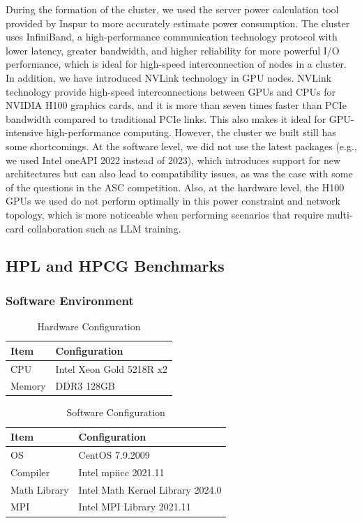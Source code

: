 \documentclass[a4paper,12pt]{article}
\begin{document}
During the formation of the cluster, we used the server power calculation tool provided by Inspur to more accurately estimate power consumption. The cluster uses InfiniBand, a high-performance communication technology protocol with lower latency, greater bandwidth, and higher reliability for more powerful I/O performance, which is ideal for high-speed interconnection of nodes in a cluster. In addition, we have introduced NVLink technology in GPU nodes. NVLink technology provide high-speed interconnections between GPUs and CPUs for NVIDIA H100 graphics cards, and it is more than seven times faster than PCIe bandwidth compared to traditional PCIe links. This also makes it ideal for GPU-intensive high-performance computing. However, the cluster we built still has some shortcomings. At the software level, we did not use the latest packages (e.g., we used Intel oneAPI 2022 instead of 2023), which introduces support for new architectures but can also lead to compatibility issues, as was the case with some of the questions in the ASC competition. Also, at the hardware level, the H100 GPUs we used do not perform optimally in this power constraint and network topology, which is more noticeable when performing scenarios that require multi-card collaboration such as LLM training.

\subsection{HPL and HPCG Benchmarks}

\subsubsection{Software Environment}
\begin{table}[H]
\centering
\caption{Hardware Configuration}
\begin{tabular}{|l|l|}
\hline
Item & Configuration \\
\hline
CPU & Intel Xeon Gold 5218R x2 \\
\hline
Memory & DDR3 128GB \\
\hline
\end{tabular}
\end{table}

\begin{table}[H]
\centering
\caption{Software Configuration}
\begin{tabular}{|l|l|}
\hline
Item & Configuration \\
\hline
OS & CentOS 7.9.2009 \\
\hline
Compiler & Intel mpiicc 2021.11 \\
\hline
Math Library & Intel Math Kernel Library 2024.0 \\
\hline
MPI & Intel MPI Library 2021.11 \\
\hline
\end{tabular}
\end{table}
\end{document}

